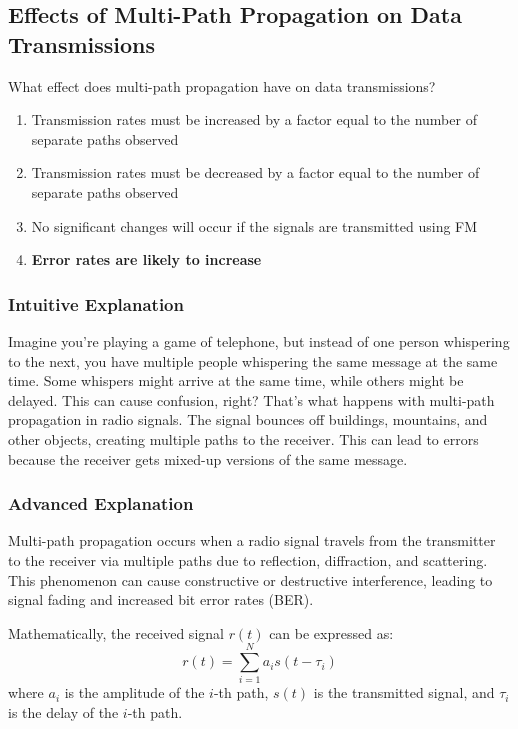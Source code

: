 \subsection{Effects of Multi-Path Propagation on Data Transmissions}
\label{T3A10}

\begin{tcolorbox}[colback=gray!10!white,colframe=black!75!black,title=T3A10]
What effect does multi-path propagation have on data transmissions?
\begin{enumerate}[label=\Alph*]
    \item Transmission rates must be increased by a factor equal to the number of separate paths observed
    \item Transmission rates must be decreased by a factor equal to the number of separate paths observed
    \item No significant changes will occur if the signals are transmitted using FM
    \item \textbf{Error rates are likely to increase}
\end{enumerate}
\end{tcolorbox}

\subsubsection{Intuitive Explanation}
Imagine you're playing a game of telephone, but instead of one person whispering to the next, you have multiple people whispering the same message at the same time. Some whispers might arrive at the same time, while others might be delayed. This can cause confusion, right? That's what happens with multi-path propagation in radio signals. The signal bounces off buildings, mountains, and other objects, creating multiple paths to the receiver. This can lead to errors because the receiver gets mixed-up versions of the same message.

\subsubsection{Advanced Explanation}
Multi-path propagation occurs when a radio signal travels from the transmitter to the receiver via multiple paths due to reflection, diffraction, and scattering. This phenomenon can cause constructive or destructive interference, leading to signal fading and increased bit error rates (BER). 

Mathematically, the received signal \( r(t) \) can be expressed as:
\[ r(t) = \sum_{i=1}^{N} a_i s(t - \tau_i) \]
where \( a_i \) is the amplitude of the \( i \)-th path, \( s(t) \) is the transmitted signal, and \( \tau_i \) is the delay of the \( i \)-th path.

